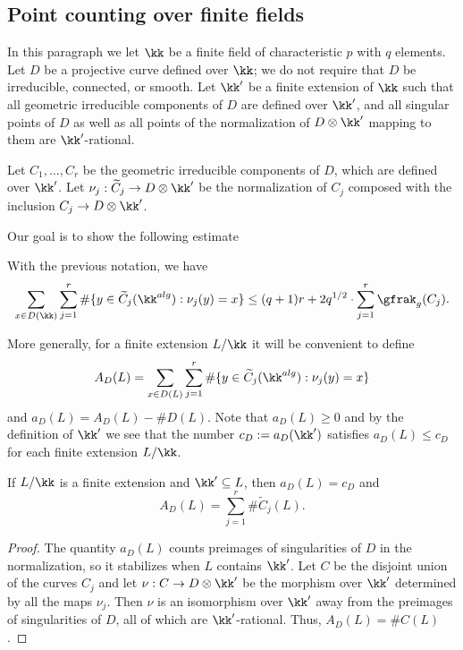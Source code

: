 



\subsection{Point counting over finite fields} \label{SecZeta}

In this paragraph we let $\kk$ be a finite field of characteristic $p$ with $q$ elements. Let $D$ be a projective curve defined over $\kk$; we do not require that $D$ be irreducible, connected, or smooth. Let $\kk'$ be a finite extension of $\kk$ such that all geometric irreducible components of $D$ are defined over $\kk'$, and all singular points of $D$ as well as all points of the normalization of $D\otimes \kk'$ mapping to them are $\kk'$-rational.

Let $C_1,...,C_r$ be the geometric irreducible components of $D$, which are defined over $\kk'$. Let $\nu_j:\widetilde{C}_j\to D\otimes \kk'$ be the normalization of $C_j$ composed with the inclusion $C_j\to D\otimes \kk'$.

Our goal is to show the following estimate

\begin{lemma}
\notready\label{LemmaWeilBound} With the previous notation, we have
$$
\sum_{x\in D(\kk)} \sum_{j=1}^r \#\{y\in \widetilde{C}_j(\kk^{alg}) : \nu_j(y)=x\} \le (q+1)r + 2q^{1/2}\cdot \sum_{j=1}^r \gfrak_g(C_j).
$$
\end{lemma}
More generally, for a finite extension $L/\kk$ it will be convenient to define
$$
A_D(L)=\sum_{x\in D(L)} \sum_{j=1}^r \#\{y\in \widetilde{C}_j(\kk^{alg}) : \nu_j(y)=x\}
$$
and $a_D(L)=A_D(L)-\#D(L)$. Note that $a_D(L)\ge 0$ and by the definition of $\kk'$ we see that the number $c_D:=a_D(\kk')$ satisfies $a_D(L)\le c_D$ for each finite extension $L/\kk$.

\begin{lemma}
\notready\label{LemmaLbig} If $L/\kk$ is a finite extension and $\kk'\subseteq L$, then $a_D(L)=c_D$ and
$$
A_D(L)=\sum_{j=1}^r \#\widetilde{C}_j(L).
$$
\end{lemma}
\begin{proof} The quantity $a_D(L)$ counts preimages of singularities of $D$ in the normalization, so it stabilizes when $L$ contains $\kk'$. Let $C$ be the disjoint union of the curves $C_j$ and let $\nu:C\to D\otimes \kk'$ be the morphism over $\kk'$ determined by all the maps $\nu_j$. Then $\nu$ is an isomorphism over $\kk'$ away from the preimages of singularities of $D$, all of which are $\kk'$-rational. Thus,  $A_D(L)=\#C(L)$.
\end{proof}


